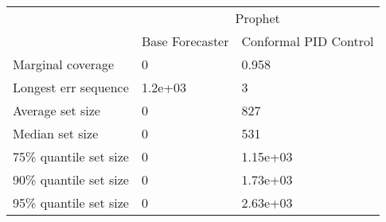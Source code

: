 \begin{tabular}{lll}
\toprule
& \multicolumn{2}{c}{Prophet} \\
& Base Forecaster & Conformal PID Control \\
\midrule
Marginal coverage & 0 & 0.958 \\
Longest err sequence & 1.2e+03 & 3 \\
Average set size & 0 & 827 \\
Median set size & 0 & 531 \\
75\% quantile set size & 0 & 1.15e+03 \\
90\% quantile set size & 0 & 1.73e+03 \\
95\% quantile set size & 0 & 2.63e+03 \\
\bottomrule
\end{tabular}
